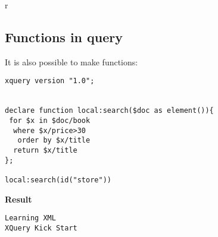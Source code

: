 r%
\subsection{Functions in query}
It is also possible to make functions:
\begin{lstlisting}[frame=single, style=code, caption={query 2}]
xquery version "1.0";
 
 
declare function local:search($doc as element()){
 for $x in $doc/book
  where $x/price>30
   order by $x/title
  return $x/title
};
 
local:search(id("store"))
\end{lstlisting}
\textbf{Result}
\begin{lstlisting}[frame=single, caption={result}]
Learning XML
XQuery Kick Start
\end{lstlisting}
